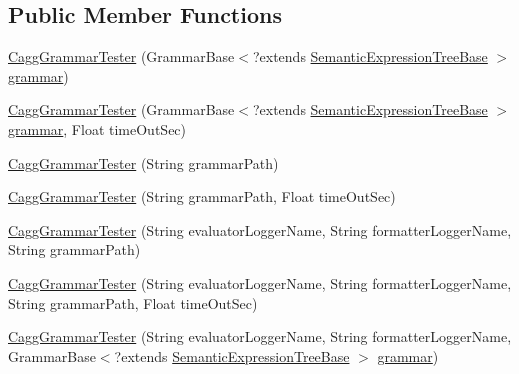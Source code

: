 \subsection*{Public Member Functions}
\begin{DoxyCompactItemize}
\item 
\hyperlink{classit_1_1emarolab_1_1cagg_1_1interfaces_1_1CaggGrammarTester_af7afb186ad9efeaaf9a0561477449065}{Cagg\-Grammar\-Tester} (Grammar\-Base$<$?extends \hyperlink{interfaceit_1_1emarolab_1_1cagg_1_1core_1_1evaluation_1_1semanticGrammar_1_1syntaxCompiler_1_1SemanticExpressionTreeBase}{Semantic\-Expression\-Tree\-Base} $>$ \hyperlink{classit_1_1emarolab_1_1cagg_1_1core_1_1evaluation_1_1interfacing_1_1GrammarTesterBase_ac6601808f37ef4327e6308143f01dc6a}{grammar})
\item 
\hyperlink{classit_1_1emarolab_1_1cagg_1_1interfaces_1_1CaggGrammarTester_a4085c12042d84cd26a00eee014db6529}{Cagg\-Grammar\-Tester} (Grammar\-Base$<$?extends \hyperlink{interfaceit_1_1emarolab_1_1cagg_1_1core_1_1evaluation_1_1semanticGrammar_1_1syntaxCompiler_1_1SemanticExpressionTreeBase}{Semantic\-Expression\-Tree\-Base} $>$ \hyperlink{classit_1_1emarolab_1_1cagg_1_1core_1_1evaluation_1_1interfacing_1_1GrammarTesterBase_ac6601808f37ef4327e6308143f01dc6a}{grammar}, Float time\-Out\-Sec)
\item 
\hyperlink{classit_1_1emarolab_1_1cagg_1_1interfaces_1_1CaggGrammarTester_a2c3947d6bab57e360f812cb5b47065cb}{Cagg\-Grammar\-Tester} (String grammar\-Path)
\item 
\hyperlink{classit_1_1emarolab_1_1cagg_1_1interfaces_1_1CaggGrammarTester_a774f16e7e63a2d6a53aa7bf21a415d9a}{Cagg\-Grammar\-Tester} (String grammar\-Path, Float time\-Out\-Sec)
\item 
\hyperlink{classit_1_1emarolab_1_1cagg_1_1interfaces_1_1CaggGrammarTester_a12659474b7f5e2fe05b609a43e1f4080}{Cagg\-Grammar\-Tester} (String evaluator\-Logger\-Name, String formatter\-Logger\-Name, String grammar\-Path)
\item 
\hyperlink{classit_1_1emarolab_1_1cagg_1_1interfaces_1_1CaggGrammarTester_a3a6083f00a4be29803b2419b306710de}{Cagg\-Grammar\-Tester} (String evaluator\-Logger\-Name, String formatter\-Logger\-Name, String grammar\-Path, Float time\-Out\-Sec)
\item 
\hyperlink{classit_1_1emarolab_1_1cagg_1_1interfaces_1_1CaggGrammarTester_a30a9119035ee296c88a7b463dc6de328}{Cagg\-Grammar\-Tester} (String evaluator\-Logger\-Name, String formatter\-Logger\-Name, Grammar\-Base$<$?extends \hyperlink{interfaceit_1_1emarolab_1_1cagg_1_1core_1_1evaluation_1_1semanticGrammar_1_1syntaxCompiler_1_1SemanticExpressionTreeBase}{Semantic\-Expression\-Tree\-Base} $>$ \hyperlink{classit_1_1emarolab_1_1cagg_1_1core_1_1evaluation_1_1interfacing_1_1GrammarTesterBase_ac6601808f37ef4327e6308143f01dc6a}{grammar})

\end{DoxyCompactItemize}
